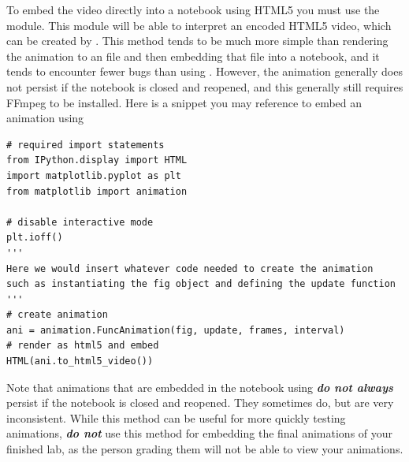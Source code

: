 To embed the video directly into a notebook using HTML5 you must use the  module.
This module will be able to interpret an encoded HTML5 video, which can be created by .
This method tends to be much more simple than rendering the animation to an  file and then embedding that file into a notebook, and it tends to encounter fewer bugs than using .
However, the animation generally does not persist if the notebook is closed and reopened, and this generally still requires FFmpeg to be installed.
Here is a snippet you may reference to embed an animation using 
\begin{lstlisting}
# required import statements
from IPython.display import HTML
import matplotlib.pyplot as plt
from matplotlib import animation

# disable interactive mode
plt.ioff()
''' 
Here we would insert whatever code needed to create the animation
such as instantiating the fig object and defining the update function
'''
# create animation
ani = animation.FuncAnimation(fig, update, frames, interval)
# render as html5 and embed
HTML(ani.to_html5_video())
\end{lstlisting}

\begin{warn}
Note that animations that are embedded in the notebook using  \textbf{\emph{do not always}} persist if the notebook is closed and reopened.
They sometimes do, but are very inconsistent.
While this method can be useful for more quickly testing animations, \textbf{\emph{do not}} use this method for embedding the final animations of your finished lab, as the person grading them will not be able to view your animations.
\end{warn}